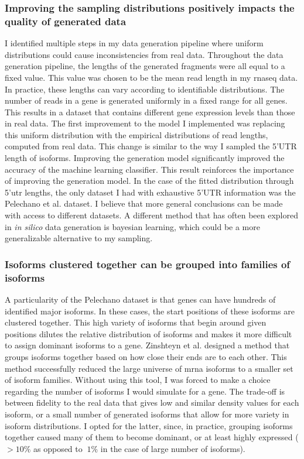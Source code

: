 \documentclass[12pt]{article}
\begin{document}
\subsubsection{Improving the sampling distributions positively impacts the quality of generated data}
I identified multiple steps in my data generation pipeline where uniform distributions could cause inconsistencies from real data. Throughout the data generation pipeline, the lengths of the generated fragments were all equal to a fixed value. This value was chosen to be the mean read length in my \acrshort{rnaseq} data. In practice, these lengths can vary according to identifiable distributions. The number of reads in a gene is generated uniformly in a fixed range for all genes. This results in a dataset that contains different gene expression levels than those in real data. The first improvement to the model I implemented was replacing this uniform distribution with the empirical distributions of read lengths, computed from real data. This change is similar to the way I sampled the 5'UTR length of isoforms. Improving the generation model significantly improved the accuracy of the machine learning classifier. This result reinforces the importance of improving the generation model. In the case of the fitted distribution through 5'\acrshort{utr} lengths, the only dataset I had with exhaustive 5'UTR information was the Pelechano et al. \cite{Pelechano2013} dataset. I believe that more general conclusions can be made with access to different datasets. A different method that has often been explored \cite{Lopez2018} in \textit{in silico} data generation is bayesian learning, which could be a more generalizable alternative to my sampling. 

\subsubsection{Isoforms clustered together can be grouped into families of isoforms}
A particularity of the Pelechano \cite{Pelechano2013} dataset is that genes can have hundreds of identified major isoforms. In these cases, the start positions of these isoforms are clustered together. This high variety of isoforms that begin around given positions dilutes the relative distribution of isoforms and makes it more difficult to assign dominant isoforms to a gene. Zinshteyn  et al. \cite{Zinshteyn2017} designed a method that groups isoforms together based on how close their ends are to each other. This method successfully reduced the large universe of \acrshort{mrna} isoforms to a smaller set of isoform families. Without using this tool, I was forced to make a choice regarding the number of isoforms I would simulate for a gene. The trade-off is between fidelity to the real data that gives low and similar density values for each isoform, or a small number of generated isoforms that allow for more variety in isoform distributions. I opted for the latter, since, in practice, grouping isoforms together caused many of them to become dominant, or at least highly expressed ($>10\%$ as opposed to $~1\%$ in the case of large number of isoforms). 
\end{document}
